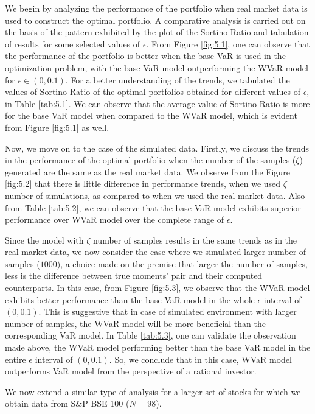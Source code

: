 \documentclass[12pt]{article}
\numberwithin{equation}{section}
\begin{document}
We begin by analyzing the performance of the portfolio when real market data is used to construct the optimal portfolio. A comparative analysis is carried out on the basis of the pattern exhibited by the plot of the Sortino Ratio and tabulation of results for some selected values of $\epsilon$. From Figure \ref{fig:5.1}, one can observe that the performance of the portfolio is better when the base VaR is used in the optimization problem, with the base VaR model outperforming the WVaR model for $\epsilon \in (0,0.1)$. For a better understanding of the trends, we tabulated the values of Sortino Ratio of the optimal portfolios obtained for different values of $\epsilon$, in Table \ref{tab:5.1}. We can observe that the average value of Sortino Ratio is more for the base VaR model when compared to the WVaR model, which is evident from Figure \ref{fig:5.1} as well.

Now, we move on to the case of the simulated data. Firstly, we discuss the trends in the performance of the optimal portfolio when the number of the samples ($\zeta$) generated are the same as the real market data. We observe from the Figure \ref{fig:5.2} that there is little difference in performance trends, when we used $\zeta$ number of simulations, as compared to when we used the real market data. Also from Table \ref{tab:5.2}, we can observe that the base VaR model exhibits superior performance over WVaR model over the complete range of $\epsilon$.

Since the model with $\zeta$ number of samples results in the same trends as in the real market data, we now consider the case where we simulated larger number of samples ($1000$), a choice made on the premise that larger the number of samples, less is the difference between true moments' pair and their computed counterparts. In this case, from Figure \ref{fig:5.3}, we observe that the WVaR model exhibits better performance than the base VaR model in the whole $\epsilon$ interval of $(0,0.1)$. This is suggestive that in case of simulated environment with larger number of samples, the WVaR model will be more beneficial than the corresponding VaR model. In Table \ref{tab:5.3}, one can validate the observation made above, the WVaR model performing better than the base VaR model in the entire $\epsilon$ interval of $(0,0.1)$. So, we conclude that in this case, WVaR model outperforms VaR model from the perspective of a rational investor.

We now extend a similar type of analysis for a larger set of stocks for which we obtain data from S\&P BSE 100 ($N = 98$).
\end{document}
